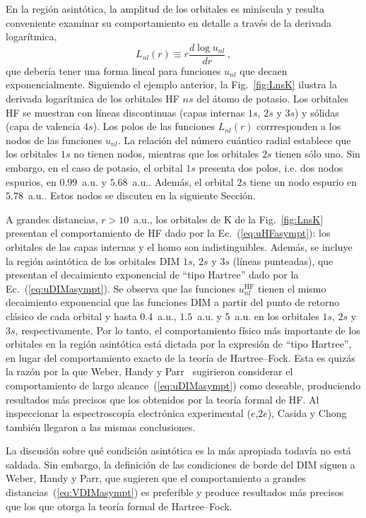 En la región asintótica, la amplitud de los orbitales es miníscula y 
resulta conveniente examinar su comportamiento en detalle a través de la 
derivada logarítmica, 
\begin{equation}
L_{nl}(r) \equiv r \frac{d \log{u_{nl}}}{d r}\,,
\label{eq:Lnl}
\end{equation}
que debería tener una forma lineal para funciones $u_{nl}$ que decaen 
exponencialmente. Siguiendo el ejemplo anterior, la Fig.~\ref{fig:LnsK} 
ilustra la derivada logarítmica de los orbitales HF $ns$ del átomo de 
potasio. Los orbitales HF se muestran con líneas discontinuas (capas 
internas $1s$, $2s$ y $3s$) y sólidas (capa de valencia $4s$). 
Los polos de las funciones $L_{nl}(r)$ corrresponden a los nodos de las 
funciones $u_{nl}$. La relación del número cuántico radial establece que 
los orbitales $1s$ no tienen nodos, mientras que los orbitales $2s$ 
tienen sólo uno. Sin embargo, en el caso de potasio, el orbital $1s$ 
presenta dos polos, i.e. dos nodos espurios, en $0.99$~a.u. y 
$5.68$~a.u.. Además, el orbital $2s$ tiene un nodo espurio en 
$5.78$~a.u.. Estos nodos se discuten en la siguiente Sección.

A grandes distancias, $r>10$~a.u., los orbitales de K de la 
Fig.~\ref{fig:LnsK} presentan el comportamiento de HF dado por la 
Ec.~(\ref{eq:uHFasympt}): los orbitales de las capas internas y el 
\acs{homo} son indistinguibles. Además, se incluye la región asintótica 
de los orbitales DIM $1s$, $2s$ y $3s$ (líneas punteadas), que presentan 
el decaimiento exponencial de ``tipo Hartree'' dado por la 
Ec.~(\ref{eq:uDIMasympt}). Se observa que las funciones 
$u_{nl}^{\mathrm{HF}}$ tienen el mismo decaimiento exponencial que las 
funciones DIM a partir del punto de retorno clásico de cada orbital y 
hasta $0.4$~a.u., $1.5$~a.u. y 5~a.u. en los orbitales $1s$, $2s$ y 
$3s$, respectivamente. Por lo tanto, el comportamiento físico más 
importante de los orbitales en la región asintótica está dictada por la 
expresión de ``tipo Hartree'', en lugar del comportamiento exacto de la 
teoría de Hartree--Fock. Esta es quizás la razón por la que Weber, Handy 
y Parr~\cite{Weber:70} sugirieron considerar el comportamiento de largo 
alcance~(\ref{eq:uDIMasympt}) como deseable, produciendo resultados más 
precisos que los obtenidos por la teoría formal de HF. Al inspeccionar 
la espectroscopía electrónica experimental ($e$,$2e$), Casida y 
Chong~\cite{Casida:89} también llegaron a las mismas conclusiones. 

La discusión sobre qué condición asintótica es la más apropiada todavía 
no está saldada. Sin embargo, la definición de las condiciones de borde 
del DIM siguen a Weber, Handy y Parr, que sugieren que el comportamiento 
a grandes distancias~(\ref{eq:VDIMasympt}) es preferible y produce 
resultados más precisos que los que otorga la teoría formal de 
Hartree--Fock. 

